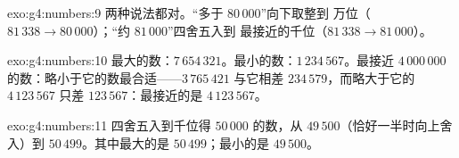 \begin{solution}{exo:g4:numbers:9}
两种说法都对。“多于 $80\,000$”向下取整到
万位（$81\,338 \to 80\,000$）；“约 $81\,000$”四舍五入到
最接近的千位（$81\,338 \to 81\,000$）。
\end{solution}

\begin{solution}{exo:g4:numbers:10}
最大的数：$7\,654\,321$。最小的数：$1\,234\,567$。最接近
$4\,000\,000$ 的数：略小于它的数最合适——$3\,765\,421$ 与它相差
$234\,579$，而略大于它的 $4\,123\,567$ 只差
$123\,567$：最接近的是 $4\,123\,567$。
\end{solution}

\begin{solution}{exo:g4:numbers:11}
四舍五入到千位得 $50\,000$ 的数，从
$49\,500$（恰好一半时向上舍入）到 $50\,499$。其中最大的是
$50\,499$；最小的是 $49\,500$。
\end{solution}
